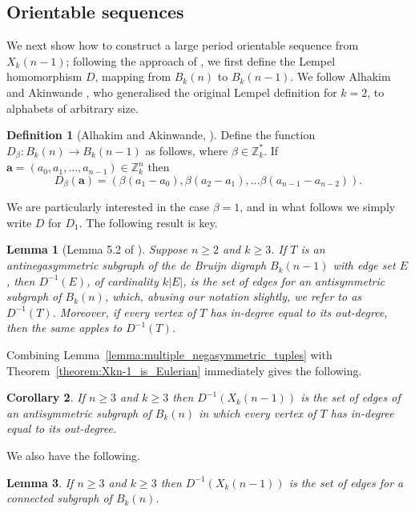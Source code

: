 \documentclass[a4paper,11pt]{article}
\theoremstyle{plain}
\newtheorem{lemma}{Lemma}[section]
\newtheorem{corollary}[lemma]{Corollary}
\theoremstyle{definition}
\newtheorem{definition}{Definition}[section]
\theoremstyle{remark}
\begin{document}
\subsection{Orientable sequences}

We next show how to construct a large period orientable sequence from $X_k(n-1)$; following the
approach of \cite{Mitchell26}, we first define the Lempel homomorphism $D$, mapping from $B_k(n)$
to $B_{k}(n-1)$. We follow Alhakim and Akinwande \cite{Alhakim11}, who generalised the original
Lempel definition \cite{Lempel70} for $k=2$, to alphabets of arbitrary size.

\begin{definition}[Alhakim and Akinwande, \cite{Alhakim11}] \label{definition:Lempel}
Define the function $D_{\beta}:B_k(n)\rightarrow B_{k}(n-1)$ as follows, where
$\beta\in\mathbb{Z}^*_k$. If $\mathbf{a} = (a_0,a_1,\ldots,a_{n-1})\in \mathbb{Z}_k^n$ then
\[ D_{\beta}(\mathbf{a}) = (\beta(a_1-a_0),\beta(a_2-a_1),\ldots\beta(a_{n-1}-a_{n-2})). \]
\end{definition}

We are particularly interested in the case $\beta=1$, and in what follows we simply write $D$ for
$D_1$.  The following result is key.

\begin{lemma}[Lemma 5.2 of \cite{Mitchell26}]  \label{lemma:Lempel_antisymmetry}
Suppose $n\geq2$ and $k\geq3$.  If $T$ is an antinegasymmetric subgraph of the de Bruijn digraph
$B_{k}(n-1)$ with edge set $E$, then $D^{-1}(E)$, of cardinality $k|E|$, is the set of edges for an
antisymmetric subgraph of $B_{k}(n)$, which, abusing our notation slightly, we refer to as
$D^{-1}(T)$. Moreover, if every vertex of $T$ has in-degree equal to its out-degree, then the same
apples to $D^{-1}(T)$.
\end{lemma}

Combining Lemma~\ref{lemma:multiple_negasymmetric_tuples} with
Theorem~\ref{theorem:Xkn-1_is_Eulerian} immediately gives the following.

\begin{corollary}  \label{corollary:D-1Xkn-1_is_nearly_Eulerian}
If $n\geq3$ and $k\geq 3$ then $D^{-1}(X_k(n-1))$ is the set of edges of an antisymmetric subgraph
of $B_{k}(n)$ in which every vertex of $T$ has in-degree equal to its out-degree.
\end{corollary}

We also have the following.

\begin{lemma}  \label{lemma:D-1Xkn-1_is_connected}
If $n\geq3$ and $k\geq 3$ then $D^{-1}(X_k(n-1))$ is the set of edges for a connected subgraph of
$B_k(n)$.
\end{lemma}
\end{document}
